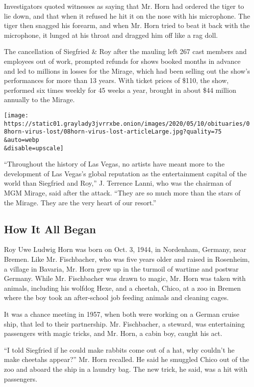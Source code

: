 Investigators quoted witnesses as saying that Mr. Horn had ordered the
tiger to lie down, and that when it refused he hit it on the nose with
his microphone. The tiger then snagged his forearm, and when Mr. Horn
tried to beat it back with the microphone, it lunged at his throat and
dragged him off like a rag doll.

The cancellation of Siegfried \& Roy after the mauling left 267 cast
members and employees out of work, prompted refunds for shows booked
months in advance and led to millions in losses for the Mirage, which
had been selling out the show's performances for more than 13 years.
With ticket prices of \$110, the show, performed six times weekly for 45
weeks a year, brought in about \$44 million annually to the Mirage.

\texttt{[image: https://static01.graylady3jvrrxbe.onion/images/2020/05/10/obituaries/08horn-virus-lost/08horn-virus-lost-articleLarge.jpg?quality=75\\\&auto=webp\\\&disable=upscale]}

``Throughout the history of Las Vegas, no artists have meant more to the
development of Las Vegas's global reputation as the entertainment
capital of the world than Siegfried and Roy,'' J. Terrence Lanni, who
was the chairman of MGM Mirage, said after the attack. ``They are so
much more than the stars of the Mirage. They are the very heart of our
resort.''

\hypertarget{how-it-all-began}{%
\subsection{How It All Began}\label{how-it-all-began}}

Roy Uwe Ludwig Horn was born on Oct. 3, 1944, in Nordenham, Germany,
near Bremen. Like Mr. Fischbacher, who was five years older and raised
in Rosenheim, a village in Bavaria, Mr. Horn grew up in the turmoil of
wartime and postwar Germany. While Mr. Fischbacher was drawn to magic,
Mr. Horn was taken with animals, including his wolfdog Hexe, and a
cheetah, Chico, at a zoo in Bremen where the boy took an after-school
job feeding animals and cleaning cages.

It was a chance meeting in 1957, when both were working on a German
cruise ship, that led to their partnership. Mr. Fischbacher, a steward,
was entertaining passengers with magic tricks, and Mr. Horn, a cabin
boy, caught his act.

``I told Siegfried if he could make rabbits come out of a hat, why
couldn't he make cheetahs appear?'' Mr. Horn recalled. He said he
smuggled Chico out of the zoo and aboard the ship in a laundry bag. The
new trick, he said, was a hit with passengers.

